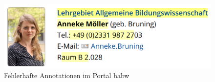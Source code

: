     \begin{figure}[htb]
        \centering
        \includegraphics[scale=\screenshotScaleFactor]{../resources/findings/case-study-1/babw/annotations/missing-annotation.png}
        \caption{Fehlerhafte Annotationen im Portal \acrshort{babw}}
        \label{image:findingTeachersBaBwWrongAnnotations}
    \end{figure}
